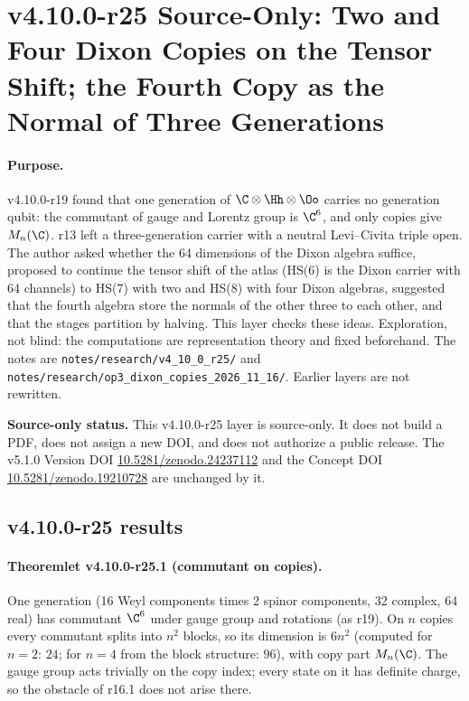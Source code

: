 
\clearpage
\section*{v4.10.0-r25 Source-Only: Two and Four Dixon Copies on the Tensor Shift; the Fourth Copy as the Normal of Three Generations}
\label{sec:v4100-r25-dixon-copies}

\paragraph{Purpose.}
v4.10.0-r19 found that one generation of \(\C\otimes\Hh\otimes\Oo\) carries no generation qubit: the commutant of gauge and Lorentz group is
\(\C^6\), and only copies give \(M_n(\C)\).  r13 left a three-generation carrier with a neutral Levi--Civita triple open.  The author asked
whether the 64 dimensions of the Dixon algebra suffice, proposed to continue the tensor shift of the atlas (HS(6) is the Dixon carrier with
64 channels) to HS(7) with two and HS(8) with four Dixon algebras, suggested that the fourth algebra store the normals of the other three to
each other, and that the stages partition by halving.  This layer checks these ideas.  Exploration, not blind: the computations are
representation theory and fixed beforehand.  The notes are \texttt{notes/\allowbreak research/\allowbreak v4\_10\_0\_r25/} and
\texttt{notes/\allowbreak research/\allowbreak op3\_dixon\_copies\_2026\_11\_16/}.  Earlier layers are not rewritten.

\noindent\textbf{Source-only status.}
This v4.10.0-r25 layer is source-only.  It does not build a PDF, does not assign a new DOI,
and does not authorize a public release.  The v5.1.0 Version DOI
\href{https://doi.org/10.5281/zenodo.24237112}{10.5281/zenodo.24237112} and the Concept DOI
\href{https://doi.org/10.5281/zenodo.19210728}{10.5281/zenodo.19210728} are unchanged by it.

\subsection*{v4.10.0-r25 results}
\label{subsec:v4100-r25-results}

\paragraph{Theoremlet v4.10.0-r25.1 (commutant on copies).}
One generation (16 Weyl components times 2 spinor components, 32 complex, 64 real) has commutant \(\C^6\) under gauge group and rotations
(as r19).  On \(n\) copies every commutant splits into \(n^2\) blocks, so its dimension is \(6n^2\) (computed for \(n=2\): \(24\); for \(n=4\)
from the block structure: \(96\)), with copy part \(M_n(\C)\).  The gauge group acts trivially on the copy index; every state on it has
definite charge, so the obstacle of r16.1 does not arise there.

